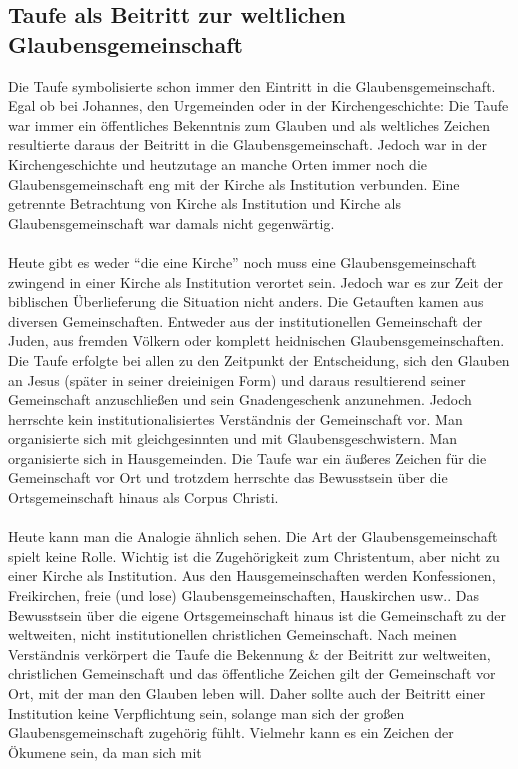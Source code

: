 \subsection{Taufe als Beitritt zur weltlichen Glaubensgemeinschaft}
Die Taufe symbolisierte schon immer den Eintritt in die Glaubensgemeinschaft. Egal ob bei Johannes, den Urgemeinden oder in der Kirchengeschichte: Die Taufe war immer ein öffentliches Bekenntnis zum Glauben und als weltliches Zeichen resultierte daraus der Beitritt in die Glaubensgemeinschaft. Jedoch war in der Kirchengeschichte und heutzutage an manche Orten immer noch die Glaubensgemeinschaft eng mit der Kirche als Institution verbunden. Eine getrennte Betrachtung von Kirche als Institution und Kirche als Glaubensgemeinschaft war damals nicht gegenwärtig.
\\~\\
Heute gibt es weder ``die eine Kirche'' noch muss eine Glaubensgemeinschaft zwingend in einer Kirche als Institution verortet sein. Jedoch war es zur Zeit der biblischen Überlieferung die Situation nicht anders. Die Getauften kamen aus diversen Gemeinschaften. Entweder aus der institutionellen Gemeinschaft der Juden, aus fremden Völkern oder komplett heidnischen Glaubensgemeinschaften. Die Taufe erfolgte bei allen zu den Zeitpunkt der Entscheidung, sich den Glauben an Jesus (später in seiner dreieinigen Form) und daraus resultierend seiner Gemeinschaft anzuschließen und sein Gnadengeschenk anzunehmen. Jedoch herrschte kein institutionalisiertes Verständnis der Gemeinschaft vor. Man organisierte sich mit gleichgesinnten und
mit Glaubensgeschwistern. Man organisierte sich in Hausgemeinden. Die Taufe war ein äußeres Zeichen für die Gemeinschaft vor Ort und trotzdem herrschte das Bewusstsein
über die Ortsgemeinschaft hinaus als Corpus Christi.
\\~\\
Heute kann man die Analogie ähnlich sehen. Die Art der Glaubensgemeinschaft spielt keine Rolle. Wichtig ist die Zugehörigkeit zum Christentum, aber nicht zu einer Kirche als Institution. Aus den Hausgemeinschaften werden Konfessionen, Freikirchen, freie (und lose) Glaubensgemeinschaften, Hauskirchen usw.. Das Bewusstsein
über die eigene Ortsgemeinschaft hinaus ist die Gemeinschaft zu der weltweiten, nicht institutionellen christlichen Gemeinschaft. Nach meinen Verständnis verkörpert die Taufe die Bekennung
\& der Beitritt zur weltweiten, christlichen Gemeinschaft und das öffentliche Zeichen gilt der Gemeinschaft vor Ort, mit der man den Glauben leben will. Daher
sollte auch der Beitritt einer Institution keine Verpflichtung sein, solange man sich der großen Glaubensgemeinschaft zugehörig fühlt. Vielmehr kann es ein Zeichen der Ökumene sein, da man sich mit
